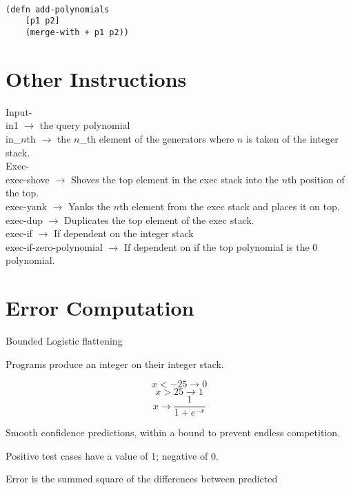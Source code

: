 \documentclass[20pt]{extarticle}
\begin{document}
\begin{verbatim}

(defn add-polynomials
    [p1 p2]
    (merge-with + p1 p2))

\end{verbatim}

\newpage
\section*{Other Instructions}

\noindent Input- \\
\indent in1 $\rightarrow$ the query polynomial \\
\indent in\_$n$th $\rightarrow$ the $n$\_th element of the generators where $n$ is taken of the integer stack. \\

\noindent Exec- \\
\indent exec-shove $\rightarrow$ Shoves the top element in the exec stack into the $n$th position of the top. \\
\indent exec-yank $\rightarrow$ Yanks the $n$th element from the exec stack and places it on top. \\
\indent exec-dup $\rightarrow$ Duplicates the top element of the exec stack. \\
\indent exec-if $\rightarrow$ If dependent on the integer stack \\
\indent exec-if-zero-polynomial $\rightarrow$ If dependent on if the top polynomial is the 0 polynomial. \\

\newpage
\section*{Error Computation}

\noindent Bounded Logistic flattening

\noindent Programs produce an integer on their integer stack. 

 $$x < -25 \rightarrow 0 $$
 $$x > 25  \rightarrow 1 $$
 $$x \rightarrow \frac{1}{1+e^{-x}}$$

\noindent Smooth confidence predictions, within a bound to prevent endless competition. 

\noindent Positive test cases have a value of 1; negative of 0.

\noindent Error is the summed square of the differences between predicted 

\end{document}
